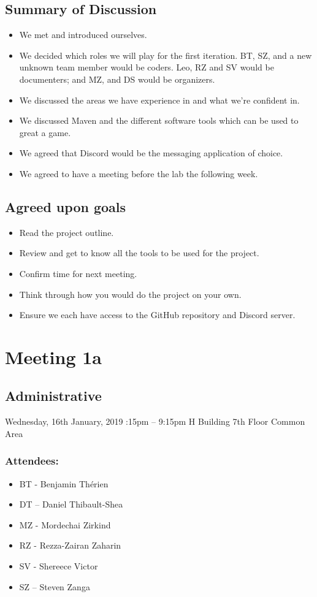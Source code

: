 \documentclass[12pt]{article}
\begin{document}
	
	\subsection{Summary of Discussion }
		\begin{itemize}
		\item We met and introduced ourselves. 
		\item We decided which roles we will play for the first iteration. 
			  BT, SZ, and a new unknown team member would be coders. 
			  Leo, RZ and SV would be documenters; and MZ, and DS would be organizers. 
		\item We discussed the areas we have experience in and what we're confident in. 
		\item We discussed Maven and the different software tools which can be used to great a game.
		\item We agreed that Discord would be the messaging application of choice.   
		\item We agreed to have a meeting before the lab the following week. 
	\end{itemize}
	

	\subsection{Agreed upon goals}
	\begin{itemize}
		\item Read the project outline.
		\item Review and get to know all the tools to be used for the project.
		\item Confirm time for next meeting.
		\item Think through how you would do the project on your own. 
		\item Ensure we each have access to the GitHub repository and Discord server. 
	\end{itemize}
	
	\pagebreak
	
	\section{Meeting 1a }
	
	\subsection{Administrative}
	Wednesday, 16th January, 2019 :15pm – 9:15pm \textbar H Building 7th Floor Common Area 
	\subsubsection{Attendees:}
	\begin{itemize}
	\item BT - Benjamin Th\'erien
	\item DT – Daniel Thibault-Shea
	\item MZ - Mordechai Zirkind 
	\item RZ - Rezza-Zairan Zaharin
	\item SV - Shereece Victor
	\item SZ – Steven Zanga
	\end{itemize}
\end{document}
